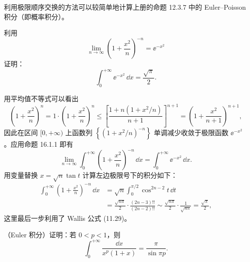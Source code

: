 利用极限顺序交换的方法可以较简单地计算上册的命题 12.3.7 中的 Euler--Poisson 积分（即概率积分）。

\begin{xexample}[16.1.2]
利用
\[
  \lim_{n\to\infty}\left(1+\frac{x^2}{n}\right)^{-n}=\ee^{-x^2}
\]
证明：
\[
  \int_0^{+\infty}\ee^{-x^2}\,\dd x=\frac{\sqrt\pi}{2}.
\]
\end{xexample}

\begin{xsolution}
用平均值不等式可以看出
\[
  \left(1+\frac{x^2}{n}\right)^n
  =1\cdot\left(1+\frac{x^2}{n}\right)^n
  \leqslant\left[\frac{1+n(1+x^2/n)}{n+1}\right]^{n+1}
  =\left(1+\frac{x^2}{n+1}\right)^{n+1},
\]
因此在区间 $[0,+\infty)$ 上函数列
$\left\{(1+x^2/n)^{-n}\right\}$ 单调减少收敛于极限函数 $\ee^{-x^2}$。应用命题 16.1.1 即有
\[
  \lim_{n\to\infty}\int_0^{+\infty}\left(1+\frac{x^2}{n}\right)^{-n}\,\dd x
  =\int_0^{+\infty}\ee^{-x^2}\,\dd x.
\]
用变量替换 $x=\sqrt n\tan t$ 计算左边极限号下的积分如下：
\[
\begin{aligned}
  \int_0^{+\infty}\left(1+\frac{x^2}{n}\right)^{-n}\,\dd x
  &=\sqrt n\int_0^{\pi/2}\cos^{2n-2}t\,\dd t\\
  &=\frac{\sqrt{n\pi}}2\cdot\frac{(2n-3)!!}{(2n-2)!!}
  \sim\frac{\sqrt{n\pi}}2\cdot\frac1{\sqrt{n\pi}}
  =\frac{\sqrt\pi}{2},
\end{aligned}
\]
这里最后一步利用了 Wallis 公式 (11.29)。
\end{xsolution}

\begin{xexample}[16.1.3]
（Euler 积分）证明：若 $0<p<1$，则
\[
  \int_0^{+\infty}\frac{\dd x}{x^p(1+x)}=\frac{\pi}{\sin\pi p}.
\]
\end{xexample}

